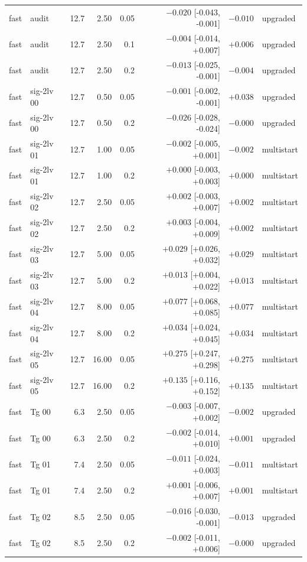 \begin{longtable}{@{}llrrrrrl@{}}
fast & audit & 12.7 & 2.50 & 0.05 & $-0.020$ [-0.043, -0.001] & $-0.010$ & upgraded\\
fast & audit & 12.7 & 2.50 & 0.1 & $-0.004$ [-0.014, +0.007] & $+0.006$ & upgraded\\
fast & audit & 12.7 & 2.50 & 0.2 & $-0.013$ [-0.025, -0.001] & $-0.004$ & upgraded\\
fast & sig-2lv 00 & 12.7 & 0.50 & 0.05 & $-0.001$ [-0.002, -0.001] & $+0.038$ & upgraded\\
fast & sig-2lv 00 & 12.7 & 0.50 & 0.2 & $-0.026$ [-0.028, -0.024] & $-0.000$ & upgraded\\
fast & sig-2lv 01 & 12.7 & 1.00 & 0.05 & $-0.002$ [-0.005, +0.001] & $-0.002$ & multistart\\
fast & sig-2lv 01 & 12.7 & 1.00 & 0.2 & $+0.000$ [-0.003, +0.003] & $+0.000$ & multistart\\
fast & sig-2lv 02 & 12.7 & 2.50 & 0.05 & $+0.002$ [-0.003, +0.007] & $+0.002$ & multistart\\
fast & sig-2lv 02 & 12.7 & 2.50 & 0.2 & $+0.003$ [-0.004, +0.009] & $+0.002$ & multistart\\
fast & sig-2lv 03 & 12.7 & 5.00 & 0.05 & $+0.029$ [+0.026, +0.032] & $+0.029$ & multistart\\
fast & sig-2lv 03 & 12.7 & 5.00 & 0.2 & $+0.013$ [+0.004, +0.022] & $+0.013$ & multistart\\
fast & sig-2lv 04 & 12.7 & 8.00 & 0.05 & $+0.077$ [+0.068, +0.085] & $+0.077$ & multistart\\
fast & sig-2lv 04 & 12.7 & 8.00 & 0.2 & $+0.034$ [+0.024, +0.045] & $+0.034$ & multistart\\
fast & sig-2lv 05 & 12.7 & 16.00 & 0.05 & $+0.275$ [+0.247, +0.298] & $+0.275$ & multistart\\
fast & sig-2lv 05 & 12.7 & 16.00 & 0.2 & $+0.135$ [+0.116, +0.152] & $+0.135$ & multistart\\
fast & Tg 00 & 6.3 & 2.50 & 0.05 & $-0.003$ [-0.007, +0.002] & $-0.002$ & upgraded\\
fast & Tg 00 & 6.3 & 2.50 & 0.2 & $-0.002$ [-0.014, +0.010] & $+0.001$ & upgraded\\
fast & Tg 01 & 7.4 & 2.50 & 0.05 & $-0.011$ [-0.024, +0.003] & $-0.011$ & multistart\\
fast & Tg 01 & 7.4 & 2.50 & 0.2 & $+0.001$ [-0.006, +0.007] & $+0.001$ & multistart\\
fast & Tg 02 & 8.5 & 2.50 & 0.05 & $-0.016$ [-0.030, -0.001] & $-0.013$ & upgraded\\
fast & Tg 02 & 8.5 & 2.50 & 0.2 & $-0.002$ [-0.011, +0.006] & $-0.000$ & upgraded\\

\end{longtable}

